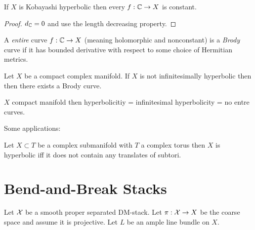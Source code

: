 \documentclass[12pt]{article}
\begin{document}
\begin{prop}
If $X$ is Kobayashi hyperbolic then every $f : \mathbb{C} \to X$ is constant.
\end{prop}

\begin{proof}
$d_{\mathbb{C}} = 0$ and use the length decreasing property.
\end{proof}

\begin{defn}
A \textit{entire} curve $f : \mathbb{C} \to X$ (meaning holomorphic and nonconstant) is a \textit{Brody} curve if it has bounded derivative with respect to some choice of Hermitian metrics. 
\end{defn}

\begin{theorem}
Let $X$ be a compact complex manifold. If $X$ is not infinitesimally hyperbolic then then there exists a Brody curve. 
\end{theorem}

\begin{cor}
$X$ compact manifold then hyperbolicitiy = infinitesimal hyperbolicity = no entre curves. 
\end{cor}

Some applications:

\begin{theorem}
Let $X \subset T$ be a complex submanifold with $T$ a complex torus then $X$ is hyperbolic iff it does not contain any translates of subtori. 
\end{theorem}

\section{Bend-and-Break Stacks}

Let $\mathcal{X}$ be a smooth proper separated DM-stack. Let $\pi : \mathcal{X} \to X$ be the coarse space and assume it is projective. Let $L$ be an ample line bundle on $X$. 
\end{document}
